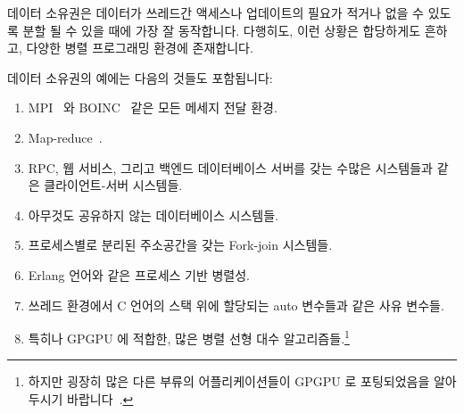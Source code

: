 데이터 소유권은 데이터가 쓰레드간 액세스나 업데이트의 필요가 적거나 없을 수
있도록 분할 될 수 있을 때에 가장 잘 동작합니다.
다행히도, 이런 상황은 합당하게도 흔하고, 다양한 병렬 프로그래밍 환경에
존재합니다.

데이터 소유권의 예에는 다음의 것들도 포함됩니다:
\iffalse

Data ownership works best when the data can be partitioned so that there
is little or no need for cross thread access or update.
Fortunately, this situation is reasonably common, and in a wide variety
of parallel-programming environments.

Examples of data ownership include:
\fi

\begin{enumerate}
\item	MPI~\cite{MPIForum2008} 와 BOINC~\cite{BOINC2008} 같은 모든 메세지 전달
	환경.
\item	Map-reduce~\cite{MapReduce2008MIT}.
\item	RPC, 웹 서비스, 그리고 백엔드 데이터베이스 서버를 갖는 수많은
	시스템들과 같은 클라이언트-서버 시스템들.
\item	아무것도 공유하지 않는 데이터베이스 시스템들.
\item	프로세스별로 분리된 주소공간을 갖는 Fork-join 시스템들.
\item	Erlang 언어와 같은 프로세스 기반 병렬성.
\item	쓰레드 환경에서 C 언어의 스택 위에 할당되는 auto 변수들과 같은 사유
	변수들.
\item	특히나 GPGPU 에 적합한, 많은 병렬 선형 대수 알고리즘들.\footnote{
		하지만 굉장히 많은 다른 부류의 어플리케이션들이 GPGPU 로
		포팅되었음을 알아두시기
		바랍니다~\cite{NormMatloff2013ParProcBook,AMD2017OpenCL,NVidia2017GPGPU,NVidia2017GPGPU-university}.}
\iffalse

\item	All message-passing environments, such as MPI~\cite{MPIForum2008}
	and BOINC~\cite{BOINC2008}.
\item	Map-reduce~\cite{MapReduce2008MIT}.
\item	Client-server systems, including RPC, web services, and
	pretty much any system with a back-end database server.
\item	Shared-nothing database systems.
\item	Fork-join systems with separate per-process address spaces.
\item	Process-based parallelism, such as the Erlang language.
\item	Private variables, for example, C-language on-stack auto variables,
	in threaded environments.
\item	Many parallel linear-algebra algorithms, especially those
	well-suited for GPGPUs.\footnote{
		But note that a great many other classes of applications
		have been ported to
		GPGPUs~\cite{NormMatloff2013ParProcBook,AMD2017OpenCL,NVidia2017GPGPU,NVidia2017GPGPU-university}.}
\fi
\end{enumerate}

